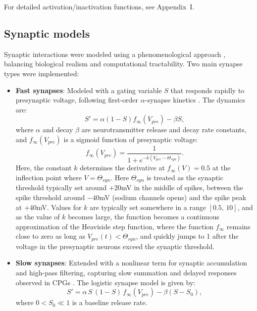 \documentclass[nofootinbib,aip,amsmath,amssymb,reprint,twocolumn,10pt]{revtex4-2}
\begin{document}
For detailed activation/inactivation functions, see Appendix~I.

\subsection{Synaptic models}

Synaptic interactions were modeled using a phenomenological approach \cite{scully2024pairing}, balancing biological realism and computational tractability. Two main synapse types were implemented:

\begin{itemize}
  \item \textbf{Fast synapses}: Modeled with a gating variable $S$ that responds rapidly to presynaptic voltage, following first-order $\alpha$-synapse kinetics \cite{destexhe1994synthesis, Wang-Rinzel-92, Rall67}. The dynamics are:
  \begin{equation}
    S' = \alpha (1-S) f_{\infty}(V_{pre}) - \beta S,
  \end{equation}
  where  $\alpha$ and decay $\beta$ are neurotransmitter release and decay rate constants, and $f_{\infty}(V_{pre})$ is a sigmoid function of presynaptic voltage:
\begin{equation}
f_{\infty}(V_{pre}) = \frac{1}{1+e^{-k(V_{pre}-\Theta_{syn})}}.  \label{finf}
\end{equation}
Here, the constant $k$ determines the derivative at $f_{\infty}(V) = 0.5$ at the inflection point where $V=\Theta_{syn}$. Here $\Theta_{syn}$ is treated as the synaptic threshold typically set around $+20$mV in the middle of spikes, between the spike threshold around $-40$mV (sodium channels opens) and the spike peak at $+40$mV. Values for $k$ are typically set somewhere in a range $\left[0.5,\, 10\right]$, and as the value of $k$ becomes large,  the function becomes a continuous approximation of the Heaviside step function, where the function $f_\infty$ remains close to zero as long as $V_{pre}(t) < \Theta_{syn}$, and quickly jumps to 1 after the voltage in the presynaptic neurons exceed the synaptic threshold.

  
  
  \item \textbf{Slow synapses}: Extended with a nonlinear term for synaptic accumulation and high-pass filtering, capturing slow summation and delayed responses observed in CPGs \cite{NW02, WNT02, TW05, SNLK11}. The logistic synapse model is given by:
  \begin{equation}
    S' = \alpha\, S\,(1-S)\, f_{\infty}(V_{pre}) - \beta (S-S_0),
  \end{equation}
  where $0<S_0 \ll 1$ is a baseline release rate.
\end{itemize}
\end{document}
